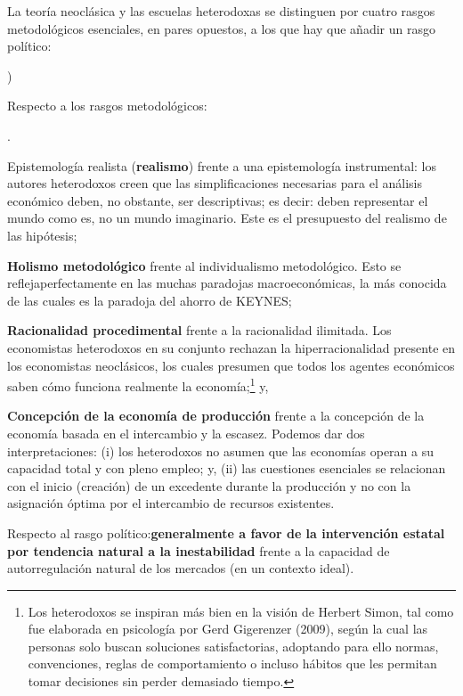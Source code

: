 \documentclass[10pt,a4paper]{article}
\newcounter{alphaitem}
\newcounter{numitem}
\newenvironment{la}
      {\begin{list}{\alph{alphaitem})}{%
          \usecounter{alphaitem}%
          \setlength{\leftmargin}{1cm}%
          \setlength{\parskip}{3pt}%
          \setlength{\itemsep}{0pt}%
          \setlength{\parsep}{0pt}%
      }}
      {\end{list}}
\newenvironment{lnum}
      {\begin{list}{\arabic{numitem}.}{%
          \usecounter{numitem}%
          \setlength{\leftmargin}{1cm}%
          \setlength{\parskip}{3pt}%
          \setlength{\itemsep}{0pt}%
          \setlength{\parsep}{0pt}%
      }}
      {\end{list}}
\begin{document}
La teoría neoclásica y las escuelas heterodoxas se distinguen por cuatro rasgos metodológicos esenciales, en pares opuestos, a los que hay que añadir un rasgo político:
\begin{la}
    \item Respecto a los rasgos metodológicos:
    \begin{lnum}
        \item Epistemología realista (\textbf{realismo}) frente a una epistemología instrumental: los autores heterodoxos creen que las simplificaciones necesarias para el análisis económico deben, no obstante, ser descriptivas; es decir: deben representar el mundo como es, no un mundo imaginario. Este es el presupuesto del realismo de las hipótesis;
        \item \textbf{Holismo metodológico} frente al individualismo metodológico. Esto se reflejaperfectamente en las muchas paradojas macroeconómicas, la más conocida de las cuales es la paradoja del ahorro de KEYNES;
        \item \textbf{Racionalidad procedimental} frente a la racionalidad ilimitada. Los economistas heterodoxos en su conjunto rechazan la hiperracionalidad presente en los economistas neoclásicos, los cuales presumen que todos los agentes económicos saben cómo funciona realmente la economía;\footnote{%
            Los heterodoxos se inspiran más bien en la visión de Herbert Simon, tal como fue elaborada en psicología por Gerd Gigerenzer (2009), según la cual las personas solo buscan soluciones satisfactorias, adoptando para ello normas, convenciones, reglas de comportamiento o incluso hábitos que les permitan tomar decisiones sin perder demasiado tiempo.
        } y,
        \item \textbf{Concepción de la economía de producción} frente a la concepción de la economía basada en el intercambio y la escasez. Podemos dar dos interpretaciones: (i) los heterodoxos no asumen que las economías operan a su capacidad total y con pleno empleo; y, (ii) las cuestiones esenciales se relacionan con el inicio (creación) de un excedente durante la producción y no con la asignación óptima por el intercambio de recursos existentes.
    \end{lnum}
    \item Respecto al rasgo político:\textbf{generalmente a favor de la intervención estatal por tendencia natural a la inestabilidad} frente a la capacidad de autorregulación natural de los mercados (en un contexto ideal).
\end{la}
\end{document}

